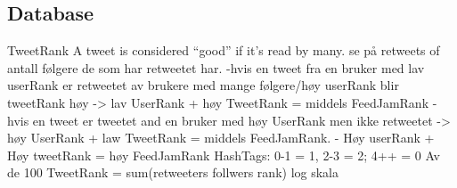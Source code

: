 \subsection{Database} %
\label{feedJamDatabase}




TweetRank
A tweet is considered “good” if it’s read by many. 
se på retweets of antall følgere de som har retweetet har.
-hvis en tweet fra en bruker med lav userRank er retweetet av brukere med mange følgere/høy userRank blir tweetRank høy -> lav UserRank + høy TweetRank = middels FeedJamRank
-hvis en tweet er tweetet and en bruker med høy UserRank men ikke retweetet -> høy UserRank + law TweetRank = middels FeedJamRank.
- Høy userRank + Høy tweetRank = høy FeedJamRank
HashTags: 0-1 = 1, 2-3 = 2; 4++ = 0
Av de 100
TweetRank = sum(retweeters follwers rank)
log skala

